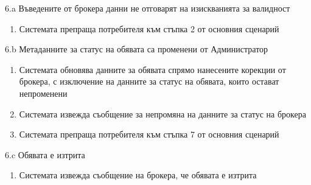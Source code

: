 \documentclass[a4paper]{article}
\begin{document}
\begin{usecase}
{        \item[6.a] Въведените от брокера данни не отговарят на изискванията за валидност
                \begin{enumerate}[1.]
                \item Системата препраща потребителя към стъпка 2 от основния сценарий
                \end{enumerate}
        \item[6.b] Метаданните за статус на обявата са променени от Администратор
                \begin{enumerate}[1.]
                \item Системата обновява данните за обявата спрямо нанесените корекции от брокера, с изключение на данните за статус на обявата, които остават непроменени
                \item Системата извежда съобщение за непромяна на данните за статус на брокера
                \item Системата препраща потребителя към стъпка 7 от основния сценарий
                \end{enumerate}
        \item[6.c] Обявата е изтрита
                \begin{enumerate}[1.]
                \item Системата извежда съобщение на брокера, че обявата е изтрита
                \end{enumerate}
        
}                
\end{usecase}
\end{document}
